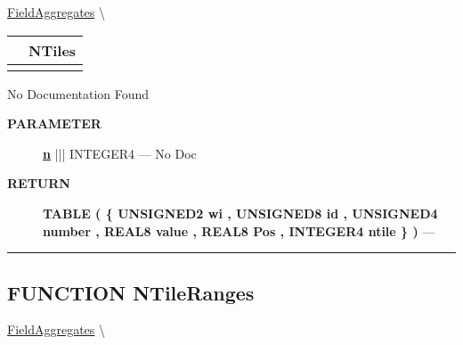 \hypertarget{ecldoc:ml_core.fieldaggregates.ntiles}{}
\hspace{0pt} \hyperlink{ecldoc:ml_core.fieldaggregates}{FieldAggregates} \textbackslash 

{\renewcommand{\arraystretch}{1.5}
\begin{tabularx}{\textwidth}{|>{\raggedright\arraybackslash}l|X|}
\hline
\hspace{0pt}\mytexttt{\color{red} } & \textbf{NTiles} \\
\hline
\multicolumn{2}{|>{\raggedright\arraybackslash}X|}{\hspace{0pt}\mytexttt{\color{param} (Types.t\_Discrete n)}} \\
\hline
\end{tabularx}
}

\par





No Documentation Found






\par
\begin{description}
\item [\colorbox{tagtype}{\color{white} \textbf{\textsf{PARAMETER}}}] \textbf{\underline{n}} ||| INTEGER4 --- No Doc
\end{description}







\par
\begin{description}
\item [\colorbox{tagtype}{\color{white} \textbf{\textsf{RETURN}}}] \textbf{TABLE ( \{ UNSIGNED2 wi , UNSIGNED8 id , UNSIGNED4 number , REAL8 value , REAL8 Pos , INTEGER4 ntile \} )} --- 
\end{description}




\rule{\linewidth}{0.5pt}
\subsection*{\textsf{\colorbox{headtoc}{\color{white} FUNCTION}
NTileRanges}}

\hypertarget{ecldoc:ml_core.fieldaggregates.ntileranges}{}
\hspace{0pt} \hyperlink{ecldoc:ml_core.fieldaggregates}{FieldAggregates} \textbackslash 


